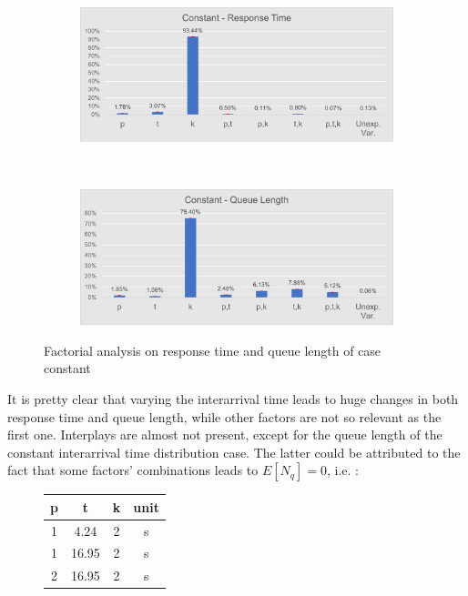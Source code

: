 \documentclass[a4paper,12pt]{article}
\begin{document}
\begin{figure}[H]
  \centering
  \begin{subfigure}[b]{.45\textwidth}
    \includegraphics[width=\textwidth]{img/FactorAnalysisResponseTimeCONST.pdf}
  \end{subfigure}
  ~
  \begin{subfigure}[b]{.45\textwidth}
    \includegraphics[width=\textwidth]{img/FactorAnalysisQueueLengthCONST.pdf}
  \end{subfigure}
  \caption{Factorial analysis on response time and queue length of case constant }
  \label{fig:faconst}
\end{figure}

It is pretty clear that varying the interarrival time leads to huge changes in both response time and queue length, while other factors are not so relevant as the first one.
Interplays are almost not present, except for the queue length of the constant interarrival time distribution case. The latter could be attributed to the fact that some factors' combinations
leads to $E[N_q] = 0$, i.e. :

\begin{figure}[H]
  \centering
  \begin{tabular}{| c | c | c | c |}\hline
    p & t & k & unit\\ \hline
    1 & 4.24 & 2 & s \\ \hline
    1 & 16.95 & 2 & s \\ \hline
    2 & 16.95 & 2 & s \\ \hline
  \end{tabular}
\end{figure}
\end{document}
